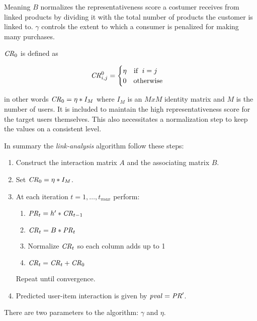 Meaning $B$ normalizes the representativeness score a costumer receives from linked products by dividing it with the total number of products the customer is linked to.  $\gamma$ controls the extent to which a consumer is penalized for making many purchases.

$\mathit{CR}_0$ is defined as

\begin{equation}
    \mathit{CR}_{i, j}^0 = \begin{cases}
        \eta \quad \text{if } \; i = j \\
        0    \quad \text{otherwise}
    \end{cases}
\end{equation}

in other words $\mathit{CR}_0 = \eta * I_M$ where $I_M$ is an $M x M$ identity matrix and $M$ is the number of users.  It is included to maintain the high representativeness score for the target users themselves. This also necessitates a normalization step to keep the values on a consistent level.

In summary the \textit{link-analysis} algorithm follow these steps:

\begin{enumerate}
    \item Construct the interaction matrix $A$ and the associating matrix $B$.

    \item Set $\mathit{CR}_0 = \eta * I_M$.
    \item At each iteration $t = 1, \ldots, t_{max}$ perform:

        \begin{enumerate}
            \item $\mathit{PR}_t = h' * \mathit{CR}_{t- 1}$
            \item $\mathit{CR}_t = B * \mathit{PR}_t$
            \item Normalize $\mathit{CR}_t$ so each column adds up to 1
            \item $\mathit{CR}_t = \mathit{CR}_t + \mathit{CR}_0$
        \end{enumerate}

        Repeat until convergence.

    \item Predicted user-item interaction is given by $\mathit{pval} = \mathit{PR}'$.

\end{enumerate}

There are two parameters to the algorithm: $\gamma$ and $\eta$.

